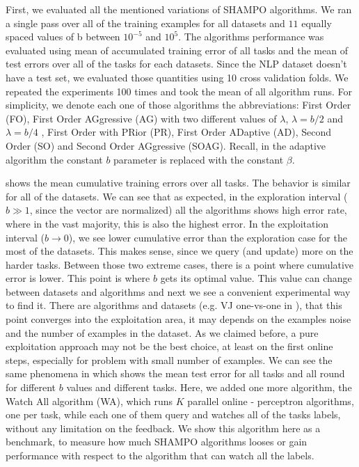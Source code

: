 First, we evaluated all the mentioned variations of SHAMPO algorithms. We ran a 
single pass over all of the training examples for all datasets and $11$ equally spaced values of b 
between $10^{-5}$ and $10^5$. The algorithms performance was evaluated using 
mean of accumulated training error of all tasks and the mean of test errors over 
all of the tasks for each datasets. Since the NLP dataset doesn't have a test 
set, we evaluated those quantities using 10 cross validation folds. We repeated 
the experiments 100 times and took the mean of all algorithm runs.
For simplicity, we denote each one of those algorithms the  
abbreviations: First Order (FO), First Order AGgressive (AG) with two different values of $\lambda$, 
$\lambda = b/2$ and $\lambda = b/4$ , First Order with PRior (PR), First Order 
ADaptive (AD), Second Order (SO) and Second Order AGgressive (SOAG). 
Recall, in the adaptive algorithm the constant $b$ parameter is replaced with the constant 
$\beta$.

 shows the mean cumulative training errors over all tasks. The behavior is similar for 
all of the datasets. We can see that as expected, in the exploration interval ($b \gg 1$, since the vector are normalized) 
all the algorithms shows high error rate, where in the vast majority, this is 
also the highest error. In the exploitation interval ($b\rightarrow 0$), we  see 
lower cumulative error than the exploration case for the most of the datasets. 
This makes sense, since we query (and update) more on the harder tasks.
Between those two extreme cases, there is a point where cumulative error is 
lower. This point is where $b$ gets its optimal value. This value can change 
between datasets and algorithms and next we see a convenient experimental way to find it. 
There are algorithms and datasets (e.g. VJ one-vs-one in ), that this point converges
into the exploitation area, it may depends on the examples noise and the number of examples 
in the dataset. As we claimed before, a pure exploitation approach may not be the best choice, at least on 
the first online steps, especially for problem with small number of examples.
We can see the same phenomena in  which shows the mean 
test error for all tasks and all round for different $b$ values and different 
tasks. Here, we added one more algorithm, the Watch All algorithm (WA), which runs $K$ parallel online - 
perceptron algorithms, one per task, while each one of them query and watches all of the tasks labels, without any limitation on the feedback.
We show this algorithm here as a benchmark, to measure how much SHAMPO algorithms looses or gain 
performance with respect to the algorithm that can watch all the labels. 



